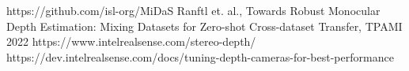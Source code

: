 \documentclass[conference]{IEEEtran}
\begin{document}
\begin{thebibliography}{00}
 https://github.com/isl-org/MiDaS
 Ranftl et. al., Towards Robust Monocular Depth Estimation:
Mixing Datasets for Zero-shot Cross-dataset Transfer, TPAMI 2022
 https://www.intelrealsense.com/stereo-depth/
 https://dev.intelrealsense.com/docs/tuning-depth-cameras-for-best-performance
\end{thebibliography}
\end{document}
